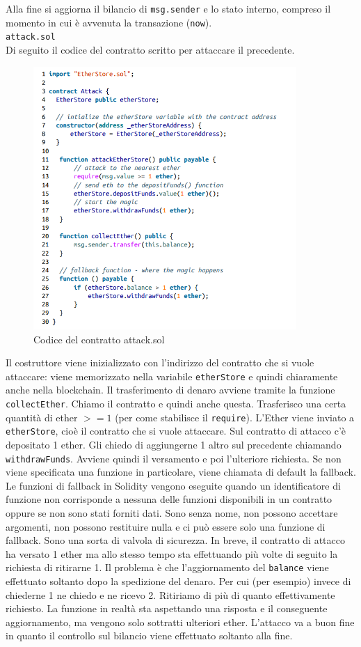 Alla fine si aggiorna il bilancio di \verb|msg.sender| e lo stato interno,
compreso il momento in
cui è avvenuta la transazione (\verb|now|).\ \\

\verb|attack.sol|\ \\
Di seguito il codice del contratto scritto per attaccare il precedente.

\begin{figure}[H]
      \centering
      \includegraphics[width=10cm, keepaspectratio]{capitoli/ethereum/imgs/dao_cattivo.png}
      \caption{Codice del contratto attack.sol}
\end{figure}

Il costruttore viene inizializzato con l'indirizzo del contratto che si vuole
attaccare: viene memorizzato nella variabile \verb|etherStore| e quindi
chiaramente anche nella blockchain.
Il trasferimento di denaro avviene tramite la funzione \verb|collectEther|.
Chiamo il contratto e
quindi anche questa. Trasferisco una certa quantità di ether $ >=1$
(per come stabilisce il \verb|require|). L'Ether viene inviato a \verb|etherStore|,
cioè il contratto che si vuole attaccare.
Sul contratto di attacco c'è depositato 1 ether.
Gli chiedo di aggiungerne 1 altro sul precedente chiamando \verb|withdrawFunds|.
Avviene quindi il versamento e poi l'ulteriore
richiesta.
Se non viene specificata una funzione in particolare,
viene chiamata di default la fallback.
Le funzioni di fallback in Solidity vengono eseguite quando un identificatore di
funzione non corrisponde a nessuna delle funzioni disponibili in un contratto
oppure se non sono stati
forniti dati. Sono senza nome, non possono accettare argomenti, non possono
restituire nulla e ci può essere solo una funzione di fallback.
Sono una sorta di valvola di sicurezza.
In breve, il contratto di attacco ha versato 1 ether ma allo stesso tempo sta
effettuando più volte di seguito la richiesta di ritirarne 1.
Il problema è che l'aggiornamento del \verb|balance| viene
effettuato soltanto dopo la spedizione del denaro. Per cui (per esempio) invece
di chiederne 1 ne chiedo e ne ricevo 2.
Ritiriamo di più di quanto effettivamente richiesto.
La funzione in realtà sta aspettando una risposta e il conseguente aggiornamento, ma
vengono solo sottratti ulteriori ether. L'attacco va a buon fine in quanto il controllo sul
bilancio viene effettuato soltanto alla fine.

